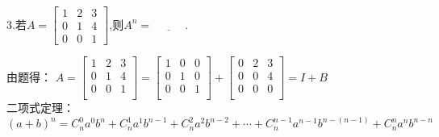 \documentclass{article}
\begin{document}
  3.若$
  A=
  \begin{bmatrix}
   1 & 2 & 3\\
   0& 1&4\\
   0& 0&1
  \end{bmatrix}
  $,则$A^{n}=\underline{~~~~~~~~~~~~~}.$

\begin{jie}

由题得：
$
A=
\begin{bmatrix}
  1&2&3\\
  0&1&4\\
  0&0&1\\
\end{bmatrix}=
\begin{bmatrix}
1&0&0\\
  0&1&0\\
  0&0&1\\
\end{bmatrix}+
\begin{bmatrix}
  0&2&3\\
  0&0&4\\
  0&0&0\\
\end{bmatrix}=I+B
$\\
\textcolor[rgb]{1.00,0.00,0.00}{二项式定理：$(a+b)^{n}=C_{n}^{0}a^{0}b^{n}+C_{n}^{1}a^{1}b^{n-1}+C_{n}^{2}a^{2}b^{n-2}+\cdots+C_{n}^{n-1}a^{n-1}b^{n-(n-1)}+C_{n}^{n}a^{n}b^{n-n}$}


\end{jie}
\end{document}
